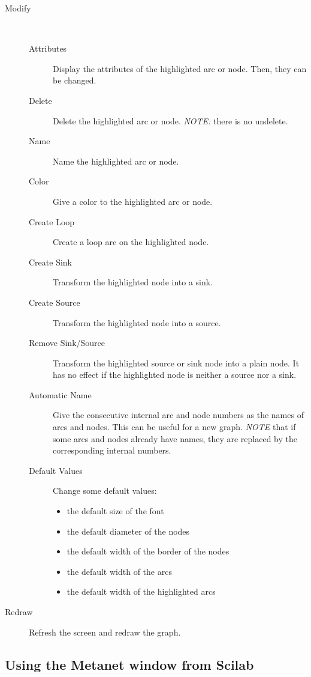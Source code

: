 \documentclass[11pt]{article}
\begin{document}
\begin{description}
\begin{description}
\end{description}
\item[Modify]\ 
\begin{description}
  \item[Attributes] Display the attributes of the highlighted arc or
	node. Then, they can be changed.
  \item[Delete] Delete the highlighted arc or node. 
	\emph{NOTE:} there is no undelete.
  \item[Name] Name the highlighted arc or node.
  \item[Color] Give a color to the highlighted arc or node.
  \item[Create Loop] Create a loop arc on the highlighted node.
  \item[Create Sink] Transform the highlighted node into a sink.
  \item[Create Source] Transform the highlighted node into a source.
  \item[Remove Sink/Source] Transform the highlighted source or sink node
	into a plain node. It has no effect if the highlighted node is neither 
	a source nor a sink.
  \item[Automatic Name] Give the consecutive internal arc and node numbers as
	the names of arcs and nodes. This can be useful for a new graph.
	\emph{NOTE} that if some arcs and nodes already have names, 
	they are replaced by the corresponding internal numbers.
  \item[Default Values] Change some default values:
	\begin{itemize}
                \item the default size of the font
                \item the default diameter of the nodes
                \item the default width of the border of the nodes
                \item the default width of the arcs
                \item the default width of the highlighted arcs
	\end{itemize}
\end{description}
\item[Redraw] Refresh the screen and redraw the graph.
\end{description}

\subsection{Using the Metanet window from Scilab}\label{show}
\end{document}
